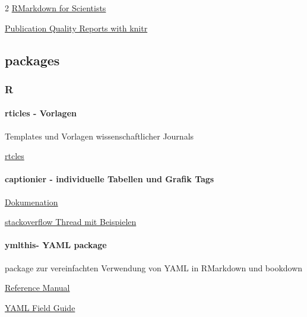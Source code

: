 \documentclass[
  a4paper,
  twoside]{article}
\let\oldparagraph\paragraph
\renewcommand{\paragraph}[1]{\oldparagraph{#1}\mbox{}}
\begin{document}
\begin {multicols}{2}
\href{https://rmd4sci.njtierney.com/}{RMarkdown for Scientists}

\href{https://warwick.ac.uk/fac/sci/wdsi/events/vacationschool2016/for-participants/materials/knitr.pdf}{Publication Quality Reports with knitr}

\hypertarget{packages}{%
\subsection{packages}\label{packages}}

\hypertarget{r}{%
\subsubsection{R}\label{r}}

\hypertarget{rticles---vorlagen}{%
\paragraph{rticles - Vorlagen}\label{rticles---vorlagen}}

Templates und Vorlagen wissenschaftlicher Journals

\href{https://github.com/rstudio/rticles}{rtcles}

\hypertarget{captionier---individuelle-tabellen-und-grafik-tags}{%
\paragraph{captionier - individuelle Tabellen und Grafik Tags}\label{captionier---individuelle-tabellen-und-grafik-tags}}

\href{https://www.rdocumentation.org/packages/captioner/versions/2.2.3}{Dokumenation}

\href{https://stackoverflow.com/questions/51945079/how-to-change-the-figure-caption-format-in-bookdow}{stackoverflow Thread mit Beispielen}

\hypertarget{ymlthis--yaml-package}{%
\paragraph{ymlthis- YAML package}\label{ymlthis--yaml-package}}

package zur vereinfachten Verwendung von YAML in RMarkdown und bookdown

\href{https://cran.r-project.org/web/packages/ymlthis/ymlthis.pdf}{Reference Manual}

\href{https://cran.r-project.org/web/packages/ymlthis/vignettes/yaml-fieldguide.html}{YAML Field Guide}


\end{multicols}
\end{document}
